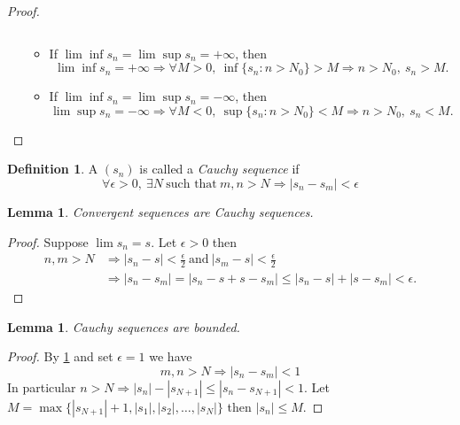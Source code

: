 \documentclass[12pt, lettersize]{book}
\theoremstyle{plain}
\newtheorem{lem}[thm]{Lemma}
\theoremstyle{definition}
\newtheorem{dfn}[thm]{Definition}
\theoremstyle{remark}
\begin{document}
\begin{proof}
\begin{enumerate}[(i)]
\begin{itemize}
\begin{displaymath}
			  	  	  \end{displaymath}
		  	  	  	  \item If $\lim\inf s_n=\lim\sup s_n=+\infty$, then
		  	  	  	  \begin{displaymath}
		  	  	  	  	\lim\inf s_n=+\infty\Rightarrow \forall M>0,\ \inf\{s_n:n>N_0\}>M\Rightarrow n>N_0,\ s_n>M.
		  	  	  	  \end{displaymath}
	  	  	  	  	  \item If $\lim\inf s_n=\lim\sup s_n=-\infty$, then
	  	  	  	  	  \begin{displaymath}
	  	  	  	  	  	\lim\sup s_n=-\infty\Rightarrow \forall M<0,\ \sup\{s_n:n>N_0\}<M\Rightarrow n>N_0,\ s_n<M.
	  	  	  	  	  \end{displaymath}
				  \end{itemize}
		\end{enumerate}
		\end{proof}
		
		\begin{dfn}\label{def:cauchy-seq}
		A $(s_n)$ is called a \emph{Cauchy sequence} if 
		\begin{displaymath}
			\forall\epsilon>0,\ \exists N\ \text{such that}\ m,n>N\Rightarrow|s_n-s_m|<\epsilon
		\end{displaymath}
		\end{dfn}
		\begin{lem}
		Convergent sequences are Cauchy sequences.
		\end{lem}
		\begin{proof}
		Suppose $\lim s_n=s$. Let $\epsilon>0$ then
		\begin{align*}
			n,m>N &\Rightarrow |s_n-s|<\frac{\epsilon}{2}\ \text{and}\ |s_m-s|<\frac{\epsilon}{2}\\
				  &\Rightarrow |s_n-s_m|=|s_n-s+s-s_m|\leq|s_n-s|+|s-s_m|<\epsilon.
		\end{align*}
		\end{proof}
		
		\begin{lem}
		Cauchy sequences are bounded.
		\end{lem}
		\begin{proof}
		By \ref{def:cauchy-seq} and set $\epsilon=1$ we have
		\begin{displaymath}
			m,n>N\Rightarrow|s_n-s_m|<1
		\end{displaymath}
		In particular $n>N\Rightarrow |s_n|-|s_{N+1}|\leq|s_n-s_{N+1}|<1$. Let $M=\max\{|s_{N+1}|+1,|s_1|,|s_2|,\dots,|s_N|\}$ then $|s_n|\leq M$.
		\end{proof}
	
\end{document}
